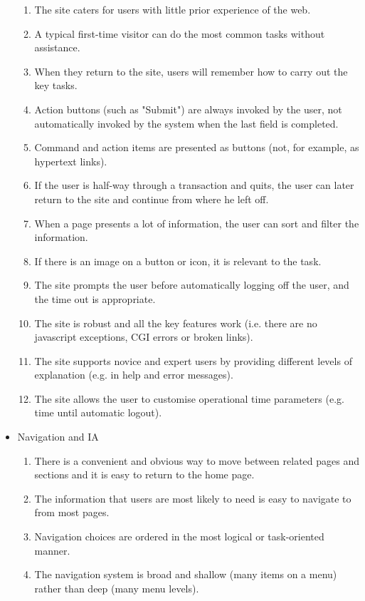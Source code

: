 \begin{itemize}
\begin{enumerate}
        \item The site caters for users with little prior experience of the web.        
        \item A typical first-time visitor can do the most common tasks without assistance.
        \item When they return to the site, users will remember how to carry out the key tasks.
        \item Action buttons (such as "Submit") are always invoked by the user, not automatically invoked by the system when the last field is completed.
        \item Command and action items are presented as buttons (not, for example, as hypertext links).
        \item If the user is half-way through a transaction and quits, the user can later return to the site and continue from where he left off.
        \item When a page presents a lot of information, the user can sort and filter the information.
        \item If there is an image on a button or icon, it is relevant to the task.
        \item The site prompts the user before automatically logging off the user, and the time out is appropriate.
        \item The site is robust and all the key features work (i.e. there are no javascript exceptions, CGI errors or broken links).
        \item The site supports novice and expert users by providing different levels of explanation (e.g. in help and error messages).
        \item The site allows the user to customise operational time parameters (e.g. time until automatic logout).
      \end{enumerate}
  \item Navigation and IA
      \begin{enumerate}
        \item There is a convenient and obvious way to move between related pages and sections and it is easy to return to the home page.
        \item The information that users are most likely to need is easy to navigate to from most pages.
        \item Navigation choices are ordered in the most logical or task-oriented manner.
        \item The navigation system is broad and shallow (many items on a menu) rather than deep (many menu levels).

\end{enumerate}
\end{itemize}
